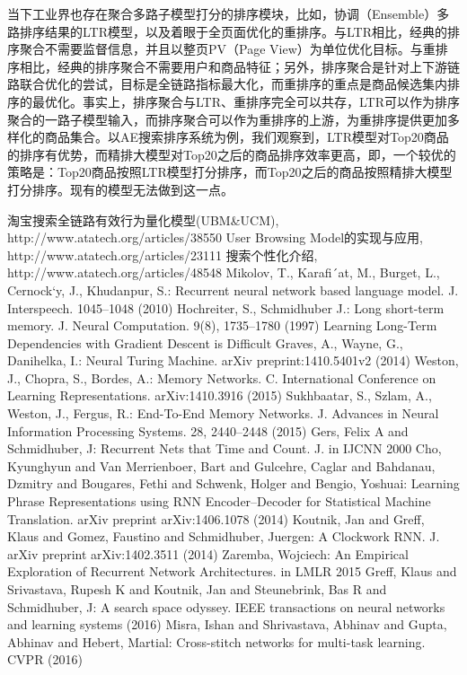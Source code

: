 当下工业界也存在聚合多路子模型打分的排序模块，比如，协调（Ensemble）多路排序结果的LTR模型，以及着眼于全页面优化的重排序。与LTR相比，经典的排序聚合不需要监督信息，并且以整页PV（Page View）为单位优化目标。与重排序相比，经典的排序聚合不需要用户和商品特征；另外，排序聚合是针对上下游链路联合优化的尝试，目标是全链路指标最大化，而重排序的重点是商品候选集内排序的最优化。事实上，排序聚合与LTR、重排序完全可以共存，LTR可以作为排序聚合的一路子模型输入，而排序聚合可以作为重排序的上游，为重排序提供更加多样化的商品集合。以AE搜索排序系统为例，我们观察到，LTR模型对Top20商品的排序有优势，而精排大模型对Top20之后的商品排序效率更高，即，一个较优的策略是：Top20商品按照LTR模型打分排序，而Top20之后的商品按照精排大模型打分排序。现有的模型无法做到这一点。



\begin{thebibliography}{99}
 淘宝搜索全链路有效行为量化模型(UBM\&UCM), http://www.atatech.org/articles/38550
 User Browsing Model的实现与应用, http://www.atatech.org/articles/23111
 搜索个性化介绍, http://www.atatech.org/articles/48548
 Mikolov, T., Karafi´at, M., Burget, L., Cernock`y, J., Khudanpur, S.: Recurrent neural network based language model. J. Interspeech. 1045–1048 (2010)
  Hochreiter, S., Schmidhuber J.: Long short-term memory. J. Neural Computation. 9(8), 1735–1780 (1997)
 Learning Long-Term Dependencies with Gradient Descent is Difficult
 Graves, A., Wayne, G., Danihelka, I.: Neural Turing Machine. arXiv preprint:1410.5401v2 (2014)
 Weston, J., Chopra, S., Bordes, A.: Memory Networks. C. International Conference on Learning Representations. arXiv:1410.3916 (2015)
 Sukhbaatar, S., Szlam, A., Weston, J., Fergus, R.: End-To-End Memory Networks. J. Advances in Neural Information Processing Systems. 28, 2440–2448 (2015)
 Gers, Felix A and Schmidhuber, J: Recurrent Nets that Time and Count. J. in IJCNN 2000
 Cho, Kyunghyun and Van Merrienboer, Bart and Gulcehre, Caglar and Bahdanau, Dzmitry and Bougares, Fethi and Schwenk, Holger and Bengio, Yoshuai: Learning Phrase Representations using RNN Encoder–Decoder for Statistical Machine Translation. arXiv preprint arXiv:1406.1078 (2014)
 Koutnik, Jan and Greff, Klaus and Gomez, Faustino and Schmidhuber, Juergen: A Clockwork RNN. J. arXiv preprint arXiv:1402.3511 (2014)
 Zaremba, Wojciech: An Empirical Exploration of Recurrent Network Architectures. in LMLR 2015
 Greff, Klaus and Srivastava, Rupesh K and Koutnik, Jan and Steunebrink, Bas R and Schmidhuber, J: A search space odyssey. IEEE transactions on neural networks and learning systems (2016)
 Misra, Ishan and Shrivastava, Abhinav and Gupta, Abhinav and Hebert, Martial: Cross-stitch networks for multi-task learning. CVPR (2016)
\end{thebibliography}

 
